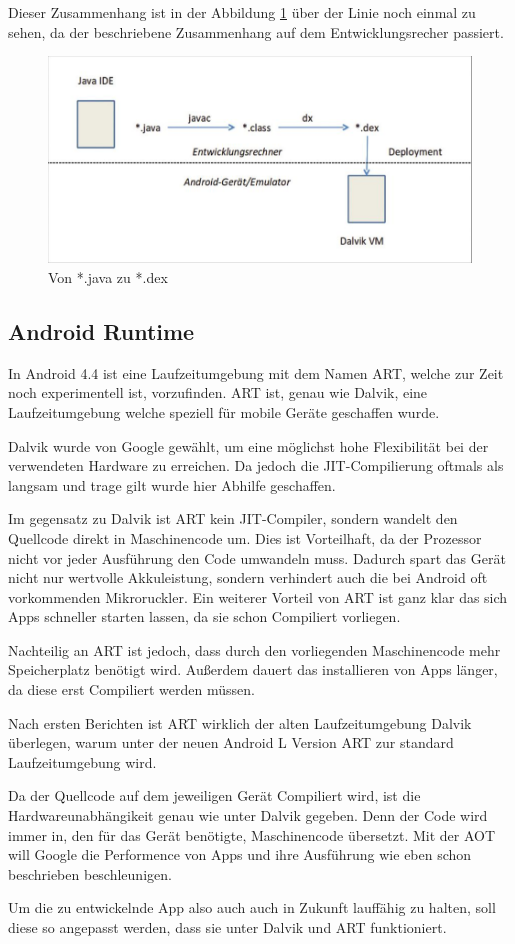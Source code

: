 Dieser Zusammenhang ist in der Abbildung \ref{JavaZuDex} \"uber der Linie noch einmal zu sehen, da der beschriebene Zusammenhang auf dem Entwicklungsrecher passiert.

\begin{figure}[!ht]
\centering
\includegraphics[width=12cm]{Bilder/JavaZuDex}
\caption{Von *.java zu *.dex \cite{Android44}}
\label{JavaZuDex}
\centering
\end{figure}

\subsection{Android Runtime}
In Android 4.4 ist eine Laufzeitumgebung mit dem Namen \ac{ART}, welche zur Zeit noch experimentell ist, vorzufinden. \ac{ART} ist, genau wie Dalvik, eine Laufzeitumgebung welche speziell f\"ur mobile Ger\"ate geschaffen wurde. 

Dalvik wurde von Google gew\"ahlt, um eine m\"oglichst hohe Flexibilit\"at bei der verwendeten Hardware zu erreichen. Da jedoch die \ac{JIT}-Compilierung oftmals als langsam und trage gilt wurde hier Abhilfe geschaffen.

Im gegensatz zu Dalvik ist \ac{ART} kein \ac{JIT}-Compiler, sondern wandelt den Quellcode direkt in Maschinencode um. Dies ist Vorteilhaft, da der Prozessor nicht vor jeder Ausf\"uhrung den Code umwandeln muss. Dadurch spart das Ger\"at nicht nur wertvolle Akkuleistung, sondern verhindert auch die bei Android oft vorkommenden Mikroruckler. 
Ein weiterer Vorteil von \ac{ART} ist ganz klar das sich Apps schneller starten lassen, da sie schon Compiliert vorliegen.

Nachteilig an \ac{ART} ist jedoch, dass durch den vorliegenden Maschinencode mehr Speicherplatz ben\"otigt wird. Au\ss{}erdem dauert das installieren von Apps l\"anger, da diese erst Compiliert werden m\"ussen. \cite{NextART} \cite{AreamobileART}

Nach ersten Berichten ist \ac{ART} wirklich der alten Laufzeitumgebung Dalvik \"uberlegen, warum unter der neuen Android L Version \ac{ART} zur standard Laufzeitumgebung wird. \cite{DevART} 

Da der Quellcode auf dem jeweiligen Ger\"at Compiliert wird, ist die Hardwareunabh\"angikeit genau wie unter Dalvik gegeben. Denn der Code wird immer in, den f\"ur das Ger\"at ben\"otigte, Maschinencode \"ubersetzt. Mit der \ac{AOT} will Google die Performence von Apps und ihre Ausf\"uhrung wie eben schon beschrieben beschleunigen.

Um die zu entwickelnde App also auch auch in Zukunft lauff\"ahig zu halten, soll diese so angepasst werden, dass sie unter Dalvik und \ac{ART} funktioniert.
